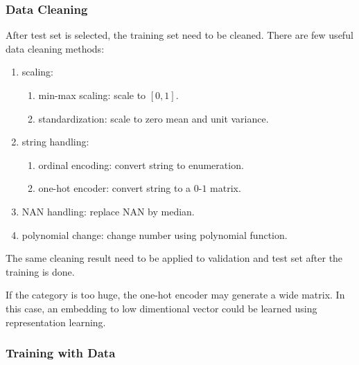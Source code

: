 \subsubsection{Data Cleaning}

After test set is selected, the training set need to be cleaned. There are few useful data cleaning methods:
\begin{enumerate}
	\item scaling:
		\begin{enumerate}
			\item min-max scaling: scale to $[0,1]$.
			\item standardization: scale to zero mean and unit variance.
		\end{enumerate}
	\item string handling:
		\begin{enumerate}
			\item ordinal encoding: convert string to enumeration.
			\item one-hot encoder: convert string to a $0$-$1$ matrix.
		\end{enumerate}
	\item NAN handling: replace NAN by median.
	\item polynomial change: change number using polynomial function.
\end{enumerate}

The same cleaning result need to be applied to validation and test set after the training is done.

If the category is too huge, the one-hot encoder may generate a wide matrix. In this case, an embedding to low dimentional vector could be learned using representation learning.

\subsubsection{Training with Data}

